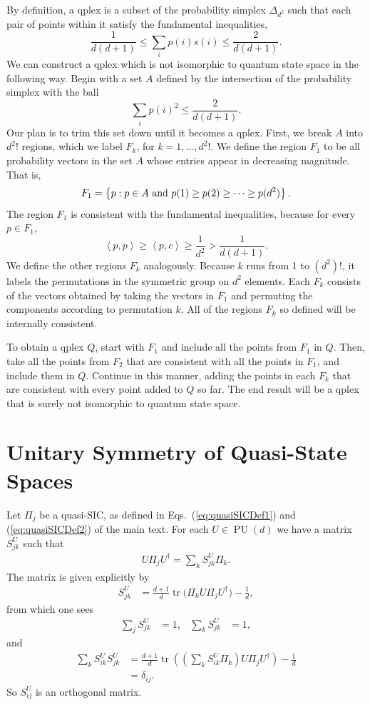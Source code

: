 \documentclass[aps,pra,superscriptaddress,10pt,tightenlines,twocolumn,nofootinbib]{revtex4}
\theoremstyle{remark}
\newcommand{\ea}[1]{\begin{align}#1\end{align}}
\newcommand{\qp}{Q}
\newcommand{\inprod}[2]{{\left\langle #1 , #2 \right\rangle}}
\DeclareMathOperator{\PU}{PU}
\DeclareMathOperator{\Tr}{tr}
\begin{document}
By definition, a qplex is a subset of the probability simplex $\Delta_{d^2}$ such that each pair of points within it satisfy the fundamental inequalities,
\begin{equation}
\frac{1}{d(d+1)} \leq \sum_i p(i)s(i) \leq \frac{2}{d(d+1)}.
\end{equation}
We can construct a qplex which is not isomorphic to quantum state space in the following way.  Begin with a set $A$ defined by the intersection of the probability simplex with the ball
\begin{equation}
\sum_i p(i)^2 \leq \frac{2}{d(d+1)}.
\end{equation}
Our plan is to trim this set down until it becomes a qplex.  First, we break $A$ into $d^2!$ regions, which we label $F_k$, for $k = 1,\ldots,d^2!$.  We define the region $F_1$ to be all probability vectors in the set $A$ whose entries appear in decreasing magnitude.  That is,
\begin{equation}
F_1 = \left\{ {p} : {p} \in A
              \hbox{ and } p(1) \geq p(2) \geq \cdots \geq p(d^2)
      \right\}.
\end{equation}
The region $F_1$ is consistent with the fundamental inequalities, because for every ${p} \in F_1$,
\begin{equation}
\inprod{p}{p} \geq \inprod{p}{c}
 \geq \frac{1}{d^2} > \frac{1}{d(d+1)}.
\end{equation}
We define the other regions $F_k$ analogously.  Because $k$ runs from 1 to $(d^2)!$, it labels the permutations in the symmetric group on $d^2$ elements.  Each $F_k$ consists of the vectors obtained by taking the vectors in $F_1$ and permuting the components according to permutation $k$.  All of the regions $F_k$ so defined will be internally consistent.

To obtain a qplex $\qp$, start with $F_1$ and include all the points from $F_1$ in $\qp$.  Then, take all the points from $F_2$ that are consistent with all the points in $F_1$, and include them in $\qp$.  Continue in this manner, adding the points in each $F_k$ that are consistent with every point added to $\qp$ so far.  The end result will be a qplex that is surely not isomorphic to quantum state space.

\section{Unitary Symmetry of Quasi-State Spaces}
\label{sec:UnitaryImplication}
Let $\Pi_j$ be a quasi-SIC, as defined in Eqs.~(\ref{eq:quasiSICDef1}) and (\ref{eq:quasiSICDef2}) of the main text.  For each $U\in\PU(d)$ we have a matrix $S^U_{jk}$ such that
\ea{
U\Pi_jU^{\dagger} = \sum_k S^U_{jk} \Pi_k.
}
The matrix is given explicitly by
\ea{
S^{U}_{jk} &= \frac{d+1}{d} \Tr\bigl( \Pi_k U \Pi_j U^{\dagger}\bigr) - \frac{1}{d},
}
from which one sees
\ea{
\sum_j S^{U}_{jk} &= 1, & \sum_k S^{U}_{jk} &= 1,
}
and
\ea{
\sum_k S^{U}_{ik}S^{U}_{jk} &= \frac{d+1}{d} \Tr\left(\left( \sum_kS^{U}_{ik}\Pi_k\right)  U\Pi_jU^{\dagger}\right)-\frac{1}{d}
\nonumber
\\
&= \delta_{ij}.
}
So $S^{U}_{ij}$ is an orthogonal matrix.
\end{document}
